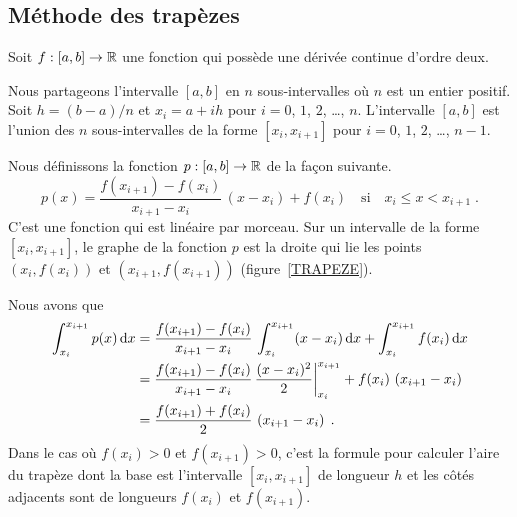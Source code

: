 {


\subsection{Méthode des trapèzes}

Soit $f:[a,b]\rightarrow \mathbb{R}$ une fonction qui possède une dérivée
continue d'ordre deux.

Nous partageons l'intervalle $[a,b]$ en $n$ sous-intervalles
où $n$ est un entier positif.  Soit $h = (b-a)/n$ et $x_i = a + i h$
pour $i=0$, $1$, $2$, \ldots, $n$.  L'intervalle $[a,b]$ est l'union
des $n$ sous-intervalles de la forme $[x_i,x_{i+1}]$ pour $i=0$, $1$,
$2$, \ldots, $n-1$.

Nous définissons la fonction $p:[a,b] \rightarrow \mathbb{R}$ de la façon suivante.
\[
p(x) = \frac{f(x_{i+1})-f(x_i)}{x_{i+1}-x_i} \, (x-x_i) + f(x_i)
\quad \text{si} \quad x_{i} \leq x < x_{i+1} \; .
\]
C'est une fonction qui est linéaire par morceau.  Sur un intervalle de
la forme $[x_{i},x_{i+1}]$, le graphe de la fonction $p$ est la droite
qui lie les points $(x_i,f(x_i))$ et $(x_{i+1},f(x_{i+1}))$
(figure~\ref{TRAPEZE}). 


Nous avons que
\begin{align*}
\int_{x_i}^{x_{i+1}} p(x) \,\mathrm{d}x &= 
\frac{f(x_{i+1})-f(x_i)}{x_{i+1}-x_i} \, \int_{x_i}^{x_{i+1}} (x-x_i) \,\mathrm{d}x
+ \int_{x_i}^{x_{i+1}} f(x_i) \,\mathrm{d}x \\
&= \frac{f(x_{i+1})-f(x_i)}{x_{i+1}-x_i} \,
\frac{(x-x_i)^2}{2}\bigg|_{x_i}^{x_{i+1}} +
f(x_i)\, \left( x_{i+1} - x_i\right) \\
&= \frac{f(x_{i+1})+f(x_i)}{2} \, \left( x_{i+1} - x_i\right) \; .
\end{align*}
Dans le cas où $f(x_i)>0$ et $f(x_{i+1})>0$, c'est la formule
pour calculer l'aire du trapèze dont la base est l'intervalle
$[x_i,x_{i+1}]$ de longueur $h$ et les côtés adjacents sont de
longueurs $f(x_i)$ et $f(x_{i+1})$.

}
